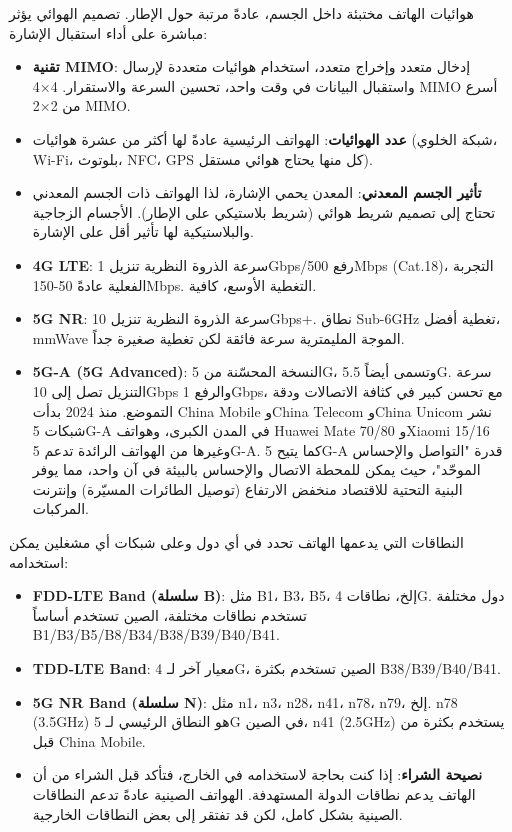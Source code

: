 
هوائيات الهاتف مختبئة داخل الجسم، عادةً مرتبة حول الإطار. تصميم الهوائي يؤثر مباشرة على أداء استقبال الإشارة:

\begin{itemize}
  \item \textbf{تقنية MIMO}: إدخال متعدد وإخراج متعدد، استخدام هوائيات متعددة لإرسال واستقبال البيانات في وقت واحد، تحسين السرعة والاستقرار. 4×4 MIMO أسرع من 2×2 MIMO.
  \item \textbf{عدد الهوائيات}: الهواتف الرئيسية عادةً لها أكثر من عشرة هوائيات (شبكة الخلوي، Wi-Fi، بلوتوث، NFC، GPS كل منها يحتاج هوائي مستقل).
  \item \textbf{تأثير الجسم المعدني}: المعدن يحمي الإشارة، لذا الهواتف ذات الجسم المعدني تحتاج إلى تصميم شريط هوائي (شريط بلاستيكي على الإطار). الأجسام الزجاجية والبلاستيكية لها تأثير أقل على الإشارة.
\end{itemize}


\begin{itemize}
  \item \textbf{4G LTE}: سرعة الذروة النظرية تنزيل 1Gbps/رفع 500Mbps (Cat.18)، التجربة الفعلية عادةً 50-150Mbps. التغطية الأوسع، كافية.
  \item \textbf{5G NR}: سرعة الذروة النظرية تنزيل 10Gbps+. نطاق Sub-6GHz تغطية أفضل، mmWave الموجة المليمترية سرعة فائقة لكن تغطية صغيرة جداً.
  \item \textbf{5G-A (5G Advanced)}: النسخة المحسّنة من 5G، وتسمى أيضاً 5.5G. سرعة التنزيل تصل إلى 10Gbps والرفع 1Gbps، مع تحسن كبير في كثافة الاتصالات ودقة التموضع. منذ 2024 بدأت China Mobile وChina Telecom وChina Unicom نشر شبكات 5G-A في المدن الكبرى، وهواتف Huawei Mate 70/80 وXiaomi 15/16 وغيرها من الهواتف الرائدة تدعم 5G-A. كما يتيح 5G-A قدرة "التواصل والإحساس الموحّد"، حيث يمكن للمحطة الاتصال والإحساس بالبيئة في آن واحد، مما يوفر البنية التحتية للاقتصاد منخفض الارتفاع (توصيل الطائرات المسيّرة) وإنترنت المركبات.
\end{itemize}


النطاقات التي يدعمها الهاتف تحدد في أي دول وعلى شبكات أي مشغلين يمكن استخدامه:

\begin{itemize}
  \item \textbf{FDD-LTE Band (سلسلة B)}: مثل B1، B3، B5، إلخ، نطاقات 4G. دول مختلفة تستخدم نطاقات مختلفة، الصين تستخدم أساساً B1/B3/B5/B8/B34/B38/B39/B40/B41.
  \item \textbf{TDD-LTE Band}: معيار آخر لـ 4G، الصين تستخدم بكثرة B38/B39/B40/B41.
  \item \textbf{5G NR Band (سلسلة N)}: مثل n1، n3، n28، n41، n78، n79، إلخ. n78 (3.5GHz) هو النطاق الرئيسي لـ 5G في الصين، n41 (2.5GHz) يستخدم بكثرة من قبل China Mobile.
  \item \textbf{نصيحة الشراء}: إذا كنت بحاجة لاستخدامه في الخارج، فتأكد قبل الشراء من أن الهاتف يدعم نطاقات الدولة المستهدفة. الهواتف الصينية عادةً تدعم النطاقات الصينية بشكل كامل، لكن قد تفتقر إلى بعض النطاقات الخارجية.
\end{itemize}

